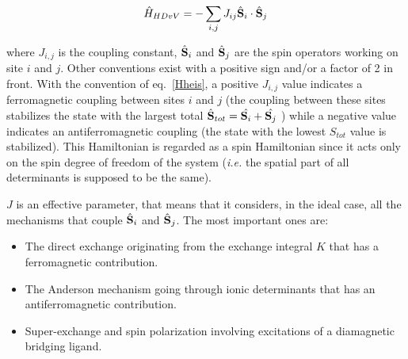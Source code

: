 \documentclass[12pt]{report}
\numberwithin{equation}{section}
\begin{document}
\begin{equation}\label{Hheis}
    \hat{H}_{HDvV}=-\sum_{i,j} J_{ij} \hat{\vb S}_i \cdot \hat{\vb S}_j
\end{equation}

\noindent where $J_{i,j}$ is the coupling constant, $\hat{\vb S}_i$ and $\hat{\vb S}_j$ are the spin operators working on site $i$ and $j$. Other conventions exist with a positive sign and/or a factor of 2 in front.  
With the convention of eq.~\ref{Hheis}, a positive $J_{i,j}$ value indicates a ferromagnetic coupling between sites $i$ and $j$ (the coupling between these sites stabilizes the state with the largest total $\hat{\vb S}_{tot}=\hat{\vb S_i}+\hat{\vb S_j}$ ) while a negative value indicates an antiferromagnetic coupling (the state with the lowest $S_{tot}$ value is stabilized).
This Hamiltonian is regarded as a spin Hamiltonian since it acts only on the spin degree of freedom of the system (\textit{i.e.} the spatial part of all determinants is supposed to be the same).

$J$  is an effective parameter, that means that it considers, in the ideal case, all the mechanisms that couple $\hat{\vb S}_i$ and $\hat{\vb S}_j$. The most important ones are:
\begin{itemize}
    \item[1-] The direct exchange originating from the exchange integral $K$ that has a ferromagnetic contribution.
    \item[2-] The Anderson mechanism going through ionic determinants that has an antiferromagnetic contribution.
    \item[3-] Super-exchange and spin polarization involving excitations of a diamagnetic bridging ligand.
\end{itemize}
\end{document}
